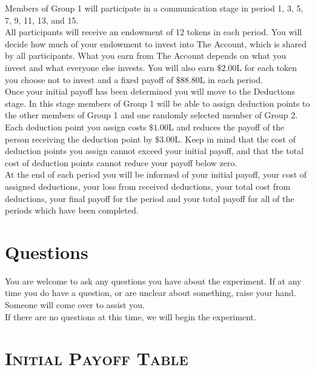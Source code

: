 \documentclass[12pt]{article}
\begin{document}
Members of Group 1 will participate in a communication stage in period 1, 3, 5, 7, 9, 11, 13, and 15.\\

All participants will receive an endowment of 12 tokens in each period. You will decide how much of your endowment to invest into The Account, which is shared by all participants. What you earn from The Account depends on what you invest and what everyone else invests. You will also earn $\$2.00\text{L}$ for each 
token you choose not to invest and a fixed payoff of $\$88.80\text{L}$ in each period.\\

Once your initial payoff has been determined you will move to the Deductions stage. In this stage members of Group 1 will be able to assign deduction points to the other members of Group 1 and one randomly selected member of Group 2. Each deduction point you assign costs $\$1.00\text{L}$ and reduces the payoff of the person receiving the deduction point by $\$3.00\text{L}$. Keep in mind that the cost of deduction points you assign cannot exceed your initial payoff, and that the total cost of deduction points cannot reduce your payoff below zero.\\

At the end of each period you will be informed of your initial payoff, your cost of assigned deductions, your loss from received deductions, your total cost from deductions, your final payoff for the period and your total payoff for all of the periods which have been completed.

\section*{Questions}


You are welcome to ask any questions you have about the experiment.  If at any time you do have a question, or are unclear about something, raise your hand. Someone will come over to assist you.\\

If there are no questions at this time, we will begin the experiment.\\


\newpage

\section*{\bf \scshape Initial Payoff Table}
\end{document}
